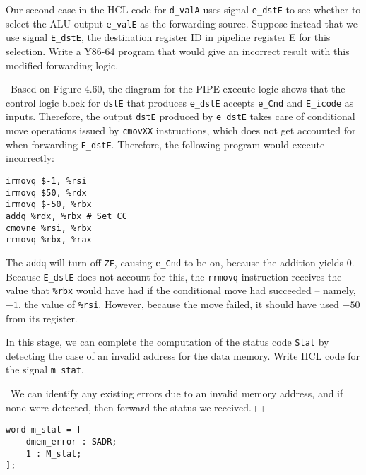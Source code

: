 \documentclass[12pt]{article}
\newenvironment{ex}[2][Exercise]{\begin{trivlist}
		\item[\hskip \labelsep {\bfseries #1}\hskip \labelsep {\bfseries #2.}]}{\end{trivlist}}
\newenvironment{sol}[1][Solution]{\begin{trivlist}
		\item[\hskip \labelsep {\bfseries #1:}]}{\end{trivlist}}
\begin{document}
\begin{ex}{4.35}
	Our second case in the HCL code for \texttt{d\_valA} uses signal \texttt{e\_dstE} to see
	whether to select the ALU output \texttt{e\_valE} as the forwarding source. Suppose instead
	that we use signal \texttt{E\_dstE}, the destination register ID in pipeline register E for
	this selection. Write a Y86-64 program that would give an incorrect result with this
	modified forwarding logic.
\end{ex}

\begin{sol}
	\
	Based on Figure 4.60, the diagram for the PIPE execute logic shows that the control logic
	block for \texttt{dstE} that produces \texttt{e\_dstE} accepts \texttt{e\_Cnd} and
	\texttt{E\_icode} as inputs. Therefore, the output \texttt{dstE} produced by
	\texttt{e\_dstE} takes care of conditional move operations issued by \texttt{cmovXX} instructions,
	which does not get accounted for when forwarding \texttt{E\_dstE}.
	Therefore, the following program would execute incorrectly:
	\begin{lstlisting}[language={}]
irmovq $-1, %rsi
irmovq $50, %rdx
irmovq $-50, %rbx
addq %rdx, %rbx # Set CC
cmovne %rsi, %rbx
rrmovq %rbx, %rax
	\end{lstlisting}
	The \texttt{addq} will turn off \texttt{ZF}, causing \texttt{e\_Cnd} to be on, because
	the addition yields 0. Because \texttt{E\_dstE} does not account for this, the \texttt{rrmovq}
	instruction receives the value that \texttt{\%rbx} would have had if the conditional move
	had succeeded -- namely, $-1$, the value of \texttt{\%rsi}. However, because the move
	failed, it should have used $-50$ from its register.
\end{sol}

\begin{ex}{4.36}
	In this stage, we can complete the computation of the status code \texttt{Stat} by detecting
	the case of an invalid address for the data memory. Write HCL code for the signal
	\texttt{m\_stat}.
\end{ex}

\begin{sol}
	\
	We can identify any existing errors due to an invalid memory address, and if none were
	detected, then forward the status we received.++
	\begin{lstlisting}[language={}]
word m_stat = [
	dmem_error : SADR;
	1 : M_stat;
];
	\end{lstlisting}
\end{sol}
\end{document}
